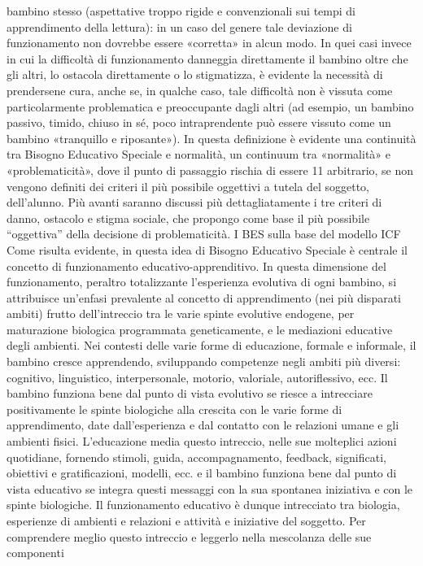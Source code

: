 bambino stesso (aspettative troppo rigide e convenzionali sui tempi di apprendimento della
lettura): in un caso del genere tale deviazione di funzionamento non dovrebbe essere «corretta» in
alcun modo. In quei casi invece in cui la difficoltà di funzionamento danneggia direttamente il
bambino oltre che gli altri, lo ostacola direttamente o lo stigmatizza, è evidente la necessità di
prendersene cura, anche se, in qualche caso, tale difficoltà non è vissuta come particolarmente
problematica e preoccupante dagli altri (ad esempio, un bambino passivo, timido, chiuso in sé,
poco intraprendente può essere vissuto come un bambino «tranquillo e riposante»).
In questa definizione è evidente una continuità tra Bisogno Educativo Speciale e normalità, un
continuum tra «normalità» e «problematicità», dove il punto di passaggio rischia di essere
11
arbitrario, se non vengono definiti dei criteri il più possibile oggettivi a tutela del soggetto,
dell’alunno. Più avanti saranno discussi più dettagliatamente i tre criteri di danno, ostacolo e
stigma sociale, che propongo come base il più possibile “oggettiva” della decisione di
problematicità.
I BES sulla base del modello ICF
Come risulta evidente, in questa idea di Bisogno Educativo Speciale è centrale il concetto di
funzionamento educativo-apprenditivo. In questa dimensione del funzionamento, peraltro
totalizzante l’esperienza evolutiva di ogni bambino, si attribuisce un’enfasi prevalente al concetto di
apprendimento (nei più disparati ambiti) frutto dell’intreccio tra le varie spinte evolutive
endogene, per maturazione biologica programmata geneticamente, e le mediazioni educative degli
ambienti. Nei contesti delle varie forme di educazione, formale e informale, il bambino cresce
apprendendo, sviluppando competenze negli ambiti più diversi: cognitivo, linguistico,
interpersonale, motorio, valoriale, autoriflessivo, ecc. Il bambino funziona bene dal punto di vista
evolutivo se riesce a intrecciare positivamente le spinte biologiche alla crescita con le varie forme
di apprendimento, date dall’esperienza e dal contatto con le relazioni umane e gli ambienti fisici.
L’educazione media questo intreccio, nelle sue molteplici azioni quotidiane, fornendo stimoli,
guida, accompagnamento, feedback, significati, obiettivi e gratificazioni, modelli, ecc. e il bambino
funziona bene dal punto di vista educativo se integra questi messaggi con la sua spontanea
iniziativa e con le spinte biologiche.
Il funzionamento educativo è dunque intrecciato tra biologia, esperienze di ambienti e
relazioni e attività e iniziative del soggetto.
Per comprendere meglio questo intreccio e leggerlo nella mescolanza delle sue componenti
